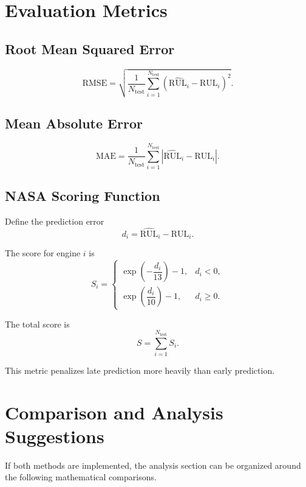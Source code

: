 \documentclass[11pt,a4paper]{article}
\begin{document}
\section{Evaluation Metrics}
\subsection{Root Mean Squared Error}
\begin{equation}
    \mathrm{RMSE} =
    \sqrt{
        \frac{1}{N_{\mathrm{test}}}
        \sum_{i=1}^{N_{\mathrm{test}}}
        \left(\widehat{\mathrm{RUL}}_i - \mathrm{RUL}_i\right)^2
    }.
\end{equation}

\subsection{Mean Absolute Error}
\begin{equation}
    \mathrm{MAE} =
    \frac{1}{N_{\mathrm{test}}}
    \sum_{i=1}^{N_{\mathrm{test}}}
    \left|
        \widehat{\mathrm{RUL}}_i - \mathrm{RUL}_i
    \right|.
\end{equation}

\subsection{NASA Scoring Function}
Define the prediction error
\begin{equation}
    d_i = \widehat{\mathrm{RUL}}_i - \mathrm{RUL}_i.
\end{equation}

The score for engine $i$ is
\begin{equation}
    S_i =
    \begin{cases}
        \exp\left(-\dfrac{d_i}{13}\right) - 1, & d_i < 0,\\[8pt]
        \exp\left(\dfrac{d_i}{10}\right) - 1, & d_i \geq 0.
    \end{cases}
\end{equation}

The total score is
\begin{equation}
    S = \sum_{i=1}^{N_{\mathrm{test}}} S_i.
\end{equation}

This metric penalizes late prediction more heavily than early prediction.

\section{Comparison and Analysis Suggestions}
If both methods are implemented, the analysis section can be organized around the following mathematical comparisons.
\end{document}

